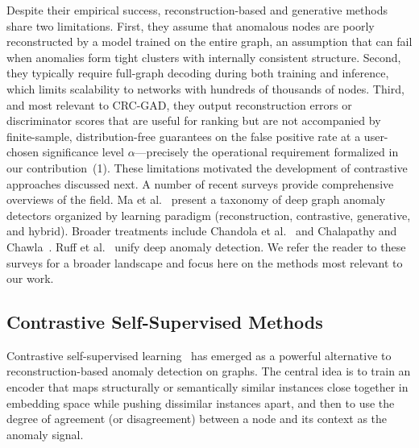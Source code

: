 \documentclass[a4paper]{cas-dc}
\theoremstyle{definition}
\begin{document}
Despite their empirical success, reconstruction-based and generative methods share two limitations.  First, they assume that anomalous nodes are poorly reconstructed by a model trained on the entire graph, an assumption that can fail when anomalies form tight clusters with internally consistent structure.  Second, they typically require full-graph decoding during both training and inference, which limits scalability to networks with hundreds of thousands of nodes.  Third, and most relevant to CRC-GAD, they output reconstruction errors or discriminator scores that are useful for ranking but are not accompanied by finite-sample, distribution-free guarantees on the false positive rate at a user-chosen significance level $\alpha$---precisely the operational requirement formalized in our contribution~(1).  These limitations motivated the development of contrastive approaches discussed next.
A number of recent surveys provide comprehensive overviews of the field.  Ma et al.~\cite{ma2021comprehensive} present a taxonomy of deep graph anomaly detectors organized by learning paradigm (reconstruction, contrastive, generative, and hybrid).
Broader treatments include Chandola et al.~\cite{chandola2009anomaly} and Chalapathy and Chawla~\cite{chalapathy2017deep}.
Ruff et al.~\cite{ruff2020unifying} unify deep anomaly detection.  We refer the reader to these surveys for a broader landscape and focus here on the methods most relevant to our work.

\subsection{Contrastive Self-Supervised Methods}
\label{sec:rw_contrastive}

Contrastive self-supervised learning~\cite{chen2020simclr,oord2018representation} has emerged as a powerful alternative to reconstruction-based anomaly detection on graphs.  The central idea is to train an encoder that maps structurally or semantically similar instances close together in embedding space while pushing dissimilar instances apart, and then to use the degree of agreement (or disagreement) between a node and its context as the anomaly signal.
\end{document}
